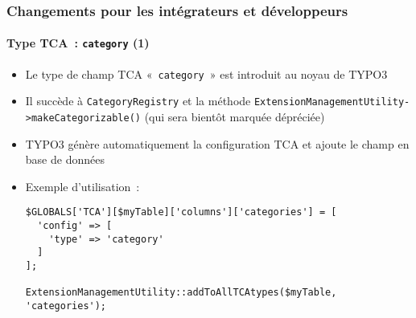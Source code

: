 %

\begin{frame}[fragile]
	\frametitle{Changements pour les intégrateurs et développeurs}
	\framesubtitle{Type TCA~: \texttt{category} (1)}


	\begin{itemize}
		\item Le type de champ TCA «~\texttt{category}~» est introduit au noyau de TYPO3
		\item Il succède à \texttt{CategoryRegistry} et la méthode\newline
			\small
				\texttt{ExtensionManagementUtility->makeCategorizable()}\newline
				(qui sera bientôt marquée dépréciée)
			\normalsize
		\item TYPO3 génère automatiquement la configuration TCA et ajoute le champ en base de données
		\item Exemple d'utilisation~:
\begin{lstlisting}
$GLOBALS['TCA'][$myTable]['columns']['categories'] = [
  'config' => [
    'type' => 'category'
  ]
];

ExtensionManagementUtility::addToAllTCAtypes($myTable, 'categories');
\end{lstlisting}

	\end{itemize}

\end{frame}

